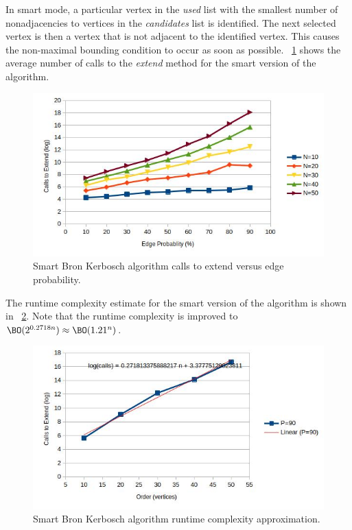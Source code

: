 In smart mode, a particular vertex in the \emph{used} list with the smallest number of nonadjacencies to vertices
in the \emph{candidates} list is identified.  The next selected vertex is then a vertex that is not adjacent to the
identified vertex.  This causes the non-maximal bounding condition to occur as soon as possible.
\figurename~\ref{fig:bron2:calls} shows the average number of calls to the \emph{extend} method for the smart
version of the algorithm.

\begin{figure}[H]
  \centering
  \includegraphics[width=5in]{bron1_calls}
  \caption{Smart Bron Kerbosch algorithm calls to extend versus edge probability.}
  \label{fig:bron2:calls}
\end{figure}

The runtime complexity estimate for the smart version of the algorithm is shown in
\figurename~\ref{fig:bron2:runtime}.  Note that the runtime complexity is improved to
\(\BO(2^{0.2718n})\approx\BO(1.21^n)\).

\begin{figure}[H]
  \centering
  \includegraphics[width=5in]{bron2_runtime}
  \caption{Smart Bron Kerbosch algorithm runtime complexity approximation.}
  \label{fig:bron2:runtime}
\end{figure}

